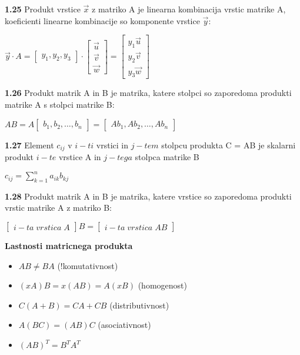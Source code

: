 \documentclass{article}
\begin{document}
\begin{multicols}{3}
\textbf{1.25} Produkt vrstice $\vec{x}$ z matriko A je
linearna kombinacija vrstic matrike A, koeficienti linearne
kombinacije so komponente vrstice $\vec{y}$:
\begin{center}
    $\vec{y} \cdot A =
    \begin{bmatrix}
        y_{1}, y_{2}, y_{3}
    \end{bmatrix} \cdot
    \begin{bmatrix}
        \vec{u}\\
        \vec{v}\\
        \vec{w}
    \end{bmatrix} =
    \begin{bmatrix}
        y_{1}\vec{u}\\
        y_{2}\vec{v}\\
        y_{3}\vec{w}
    \end{bmatrix}
    $
\end{center}

\textbf{1.26} Produkt matrik A in B je matrika, katere stolpci
so zaporedoma produkti matrike A s stolpci matrike B:
\begin{center}
    $AB = A
    \begin{bmatrix}
        b_{1}, b_{2}, \dots ,b_{n}
    \end{bmatrix} =
    \begin{bmatrix}
        Ab_{1}, Ab_{2}, \dots ,Ab_{n}
    \end{bmatrix}
    $
\end{center}

\textbf{1.27} Element $c_{ij}$ v $i-ti$ vrstici in $j-tem$ stolpcu
produkta C = AB je skalarni produkt $i-te$ vrstice A in $j-tega$
stolpca matrike B
\begin{center}
    $c_{ij} =
    \sum_{k=1}^{n} a_{ik}b_{kj}
    $
\end{center}

\textbf{1.28} Produkt matrik A in B je matrika, katere vrstice
so zaporedoma produkti vrstic matrike A z matriko B:
\begin{center}
    $
    \begin{bmatrix}
        i-ta\; vrstica\; A
    \end{bmatrix}B =
    \begin{bmatrix}
        i-ta\; vrstica\; AB
    \end{bmatrix}
    $
\end{center}

\textbf{Lastnosti matricnega produkta}
\begin{itemize}
    \item $AB \neq BA$ (!komutativnost)
    \item $(xA)B = x(AB) = A(xB)$ (homogenost)
    \item $C(A + B) = CA + CB$ (distributivnost)
    \item $A(BC) = (AB)C$ (asociativnost)
    \item $(AB)^{T} = B^{T}A^{T}$
\end{itemize}


\end{multicols}
\end{document}
